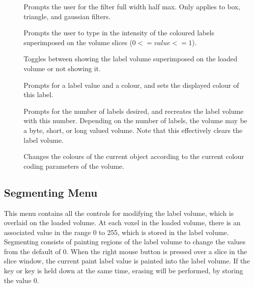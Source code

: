 \begin{description}
\item[]  Prompts the user for
                      the filter full width half max.  Only applies to box,
                      triangle, and gaussian filters.
\item[]  Prompts the user to type in the
                      intensity of the coloured labels superimposed on the 
                      volume slices ($0 <= value <= 1$).
\item[]  Toggles between showing
                      the label volume superimposed on the loaded
                      volume or not showing it.
\item[]  Prompts for a
                      label value and a colour, and sets the displayed
                      colour of this label.
\item[]  Prompts for the number
                      of labels desired, and recreates the label volume
                      with this number.  Depending on the number of labels,
                      the volume may be a byte, short, or long valued volume.
                      Note that this effectively clears the label volume.
\item[]  Changes the
     colours of the current object according to the current colour
     coding parameters of the volume.
\end{description}

\subsection{Segmenting Menu}

This menu contains all the controls for modifying the label volume,
which is overlaid on the loaded volume.  At each voxel in the loaded
volume, there is an associated value in the range 0 to 255, which is
stored in the label volume.  Segmenting consists of painting regions
of the label volume to change the values from the default of 0.
When the right mouse button is pressed over a slice in the slice
window, the current paint label value is painted into the label
volume.  If the  key or  key is held down
at the same time, erasing will be performed, by storing the value 0.

